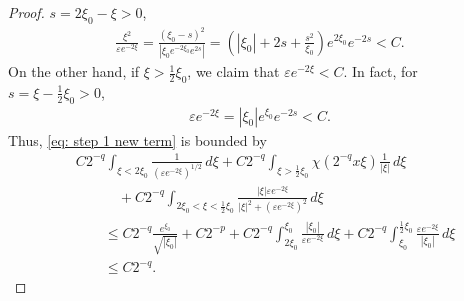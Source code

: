 \documentclass[GreensFunctions.tex]{subfiles}
\begin{document}
\begin{proof}
	$s = 2\xi_0-\xi>0$, 
	\begin{align*}
		\frac{\xi^2}{\varepsilon e^{-2\xi}} 
			= 
				\frac{(\xi_0-s)^2}{|\xi_0 e^{-2\xi_0}e ^{2s}|} 
			= 
				\left(
					|\xi_0| + 2s + \frac{s^2}{\xi_0}
				\right)
				e^{2\xi_0}e^{-2s}
			<C.
	\end{align*}
	On the other hand, if $\xi > \frac12\xi_0$, we claim that $\varepsilon e^{-2\xi}<C$. 
	In fact, for $s =\xi -  \frac12\xi_0>0$,
	\begin{align*}
		\varepsilon e^{-2\xi} = |\xi_0|e^{\xi_0} e^{-2s}<C.		
	\end{align*}
	Thus, \eqref{eq: step 1 new term} is bounded by
	\begin{align*}
	&C2^{-q}
		\int_{\xi<2\xi_0} 
			\frac{1}{(\varepsilon e^{-2\xi})^{1/2}}
		\,d\xi 
		+ C2^{-q}
		\int_{\xi>\frac12\xi_0} 
			\chi(2^{-q}x\xi) \frac{1}{|\xi|}
		\,d\xi
		\\
	&\qquad\quad+ 
		C2^{-q} 
		\int_{2\xi_0<\xi<\frac12\xi_0} 
			\frac{| \xi |\varepsilon e^{-2\xi}}{|\xi|^2+(\varepsilon e^{-2\xi})^2}
		\,d\xi
		\\
	&\qquad\le
		C2^{-q}\frac{e^{\xi_0}}{\sqrt{|\xi_0|}}
		+C2^{-p} 
		+C2^{-q}
		\int_{2\xi_0}^{\xi_0}
			\frac{|\xi_0|}{\varepsilon e^{-2\xi}}
		\,d\xi 
		+ C2^{-q}
		\int_{\xi_0}^{\frac12\xi_0}
			\frac{\varepsilon e^{-2\xi}}{|\xi_0|}
		\,d\xi
		\\
	&\qquad\le 
		C2^{-q}.
	\end{align*}


\end{proof}
\end{document}
